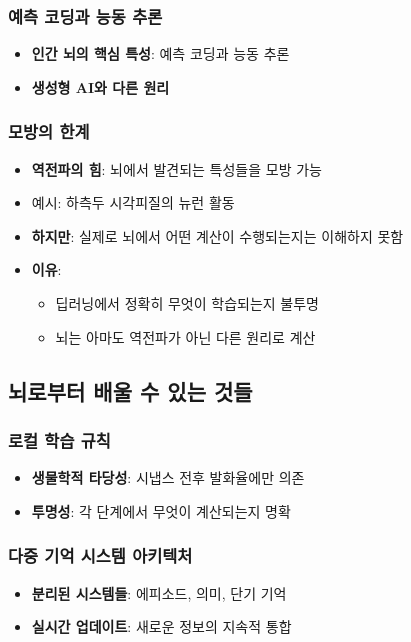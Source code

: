 \documentclass[openany]{book}
\begin{document}
\begin{appendices}
\subsubsection{예측 코딩과 능동 추론}
\begin{itemize}
\item \textbf{인간 뇌의 핵심 특성}: 예측 코딩과 능동 추론
\item \textbf{생성형 AI와 다른 원리}
\end{itemize}

\subsubsection{모방의 한계}
\begin{itemize}
\item \textbf{역전파의 힘}: 뇌에서 발견되는 특성들을 모방 가능
\item 예시: 하측두 시각피질의 뉴런 활동
\item \textbf{하지만}: 실제로 뇌에서 어떤 계산이 수행되는지는 이해하지 못함
\item \textbf{이유}: 
  \begin{itemize}
  \item 딥러닝에서 정확히 무엇이 학습되는지 불투명
  \item 뇌는 아마도 역전파가 아닌 다른 원리로 계산
  \end{itemize}
\end{itemize}

\subsection{뇌로부터 배울 수 있는 것들}

\subsubsection{로컬 학습 규칙}
\begin{itemize}
\item \textbf{생물학적 타당성}: 시냅스 전후 발화율에만 의존
\item \textbf{투명성}: 각 단계에서 무엇이 계산되는지 명확
\end{itemize}

\subsubsection{다중 기억 시스템 아키텍처}
\begin{itemize}
\item \textbf{분리된 시스템들}: 에피소드, 의미, 단기 기억
\item \textbf{실시간 업데이트}: 새로운 정보의 지속적 통합
\end{itemize}


\end{appendices}
\end{document}
